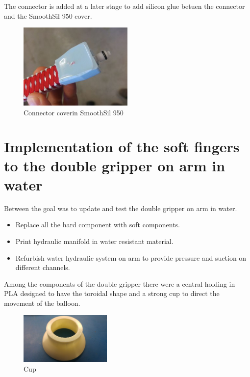 \documentclass{article}
\begin{document}
The connector is added at a later stage to add silicon glue betuen the connector and the SmoothSil 950 cover.
\begin{figure}[h]
	\centering
	\includegraphics[width=0.5\textwidth]{Pictures/fingerOnToroidal/ConnectorCover.jpg}
	\caption{Connector coverin SmoothSil 950}
	\label{fig:connectorCover}
\end{figure}


\newpage

\section{Implementation of the soft fingers to the double gripper on arm in water}
Between the goal was to update and test the double gripper on arm in water.
\begin{itemize}
    \item	Replace all the hard component with soft components.
    \item	Print hydraulic manifold in water resistant material.
    \item	Refurbish water hydraulic system on arm to provide pressure and suction on different channels.
\end{itemize}

Among the components of the double gripper there were a central holding in PLA designed to have the toroidal shape and a strong cup to direct the movement of the balloon.\\
\begin{figure}[h]
    \centering
    \includegraphics[width=0.4\textwidth]{Pictures/fingerOnToroidal/cup.jpg}
    \caption{Cup}
    \label{fig:cup}
\end{figure}
\end{document}
